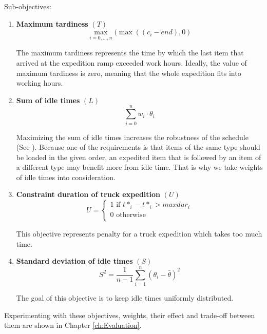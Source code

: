 \documentclass{ctuthesis}
\begin{document}
Sub-objectives:

\begin{enumerate}
\item \textbf{Maximum tardiness} $(T)$\\ \begin{equation}\max_{i=0,\ldots,n}(\max((c_i - end), 0)\end{equation}

The maximum tardiness represents the time by which the last item that arrived at the expedition ramp exceeded work hours. Ideally, the value of maximum tardiness is zero, meaning that the whole expedition fits into working hours.

\item \textbf{Sum of idle times} $(L)$\\ 
\begin{equation}
    \sum_{i=0}^{n} w_i \cdot \theta_i
\end{equation}

Maximizing the sum of idle times increases the robustness of the schedule (See \cite{pinedo}). Because one of the requirements is that items of the same type should be loaded in the given order, an expedited item that is followed by an item of a different type may benefit more from idle time. That is why we take weights of idle times into consideration.

\item \textbf{Constraint duration of truck expedition} $(U)$
\begin{equation} 
   U = \begin{cases}
        1 \text{ if } t*_i - t*_i > maxdur_i\\
        \text{0 otherwise}\\
       \end{cases}
\end{equation}

This objective represents penalty for a truck expedition which takes too much time.

\item \textbf{Standard deviation of idle times} $(S)$
\begin{equation} 
    S^2=\frac{1}{n-1}\sum_{i=1}^{n} (\theta_{i} -\bar{\theta})^2 
\end{equation}

The goal of this objective is to keep idle times uniformly distributed. 

\end{enumerate}
 
 Experimenting with these objectives, weights, their effect and trade-off between them are shown in Chapter \ref{ch:Evaluation}.
\end{document}

